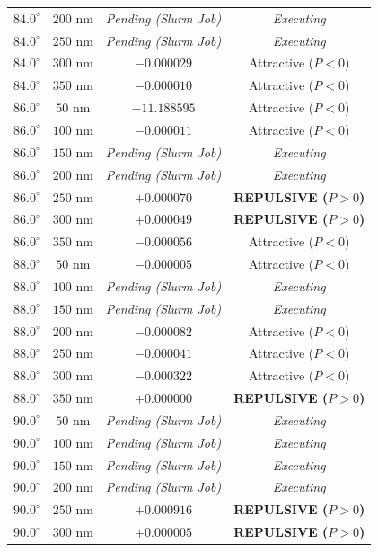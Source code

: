 \documentclass[12pt,letterpaper]{article}
\begin{document}
\begin{table}[h!]
\begin{tabular}{cccc}
$84.0^\circ$ & $200$ nm & \textit{Pending (Slurm Job)} & \textit{Executing} \\
$84.0^\circ$ & $250$ nm & \textit{Pending (Slurm Job)} & \textit{Executing} \\
$84.0^\circ$ & $300$ nm & $-0.000029$ & Attractive ($P<0$) \\
$84.0^\circ$ & $350$ nm & $-0.000010$ & Attractive ($P<0$) \\
$86.0^\circ$ & $50$ nm & $-11.188595$ & Attractive ($P<0$) \\
$86.0^\circ$ & $100$ nm & $-0.000011$ & Attractive ($P<0$) \\
$86.0^\circ$ & $150$ nm & \textit{Pending (Slurm Job)} & \textit{Executing} \\
$86.0^\circ$ & $200$ nm & \textit{Pending (Slurm Job)} & \textit{Executing} \\
$86.0^\circ$ & $250$ nm & $+0.000070$ & \textbf{REPULSIVE ($P>0$)} \\
$86.0^\circ$ & $300$ nm & $+0.000049$ & \textbf{REPULSIVE ($P>0$)} \\
$86.0^\circ$ & $350$ nm & $-0.000056$ & Attractive ($P<0$) \\
$88.0^\circ$ & $50$ nm & $-0.000005$ & Attractive ($P<0$) \\
$88.0^\circ$ & $100$ nm & \textit{Pending (Slurm Job)} & \textit{Executing} \\
$88.0^\circ$ & $150$ nm & \textit{Pending (Slurm Job)} & \textit{Executing} \\
$88.0^\circ$ & $200$ nm & $-0.000082$ & Attractive ($P<0$) \\
$88.0^\circ$ & $250$ nm & $-0.000041$ & Attractive ($P<0$) \\
$88.0^\circ$ & $300$ nm & $-0.000322$ & Attractive ($P<0$) \\
$88.0^\circ$ & $350$ nm & $+0.000000$ & \textbf{REPULSIVE ($P>0$)} \\
$90.0^\circ$ & $50$ nm & \textit{Pending (Slurm Job)} & \textit{Executing} \\
$90.0^\circ$ & $100$ nm & \textit{Pending (Slurm Job)} & \textit{Executing} \\
$90.0^\circ$ & $150$ nm & \textit{Pending (Slurm Job)} & \textit{Executing} \\
$90.0^\circ$ & $200$ nm & \textit{Pending (Slurm Job)} & \textit{Executing} \\
$90.0^\circ$ & $250$ nm & $+0.000916$ & \textbf{REPULSIVE ($P>0$)} \\
$90.0^\circ$ & $300$ nm & $+0.000005$ & \textbf{REPULSIVE ($P>0$)} \\

\end{tabular}
\end{table}
\end{document}
